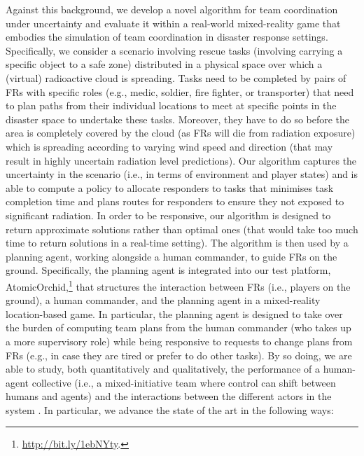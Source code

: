 Against this background, we develop a novel algorithm for team coordination under uncertainty and evaluate it within a real-world mixed-reality game that embodies the simulation of team coordination in disaster response settings. Specifically, we consider a scenario involving rescue tasks (involving carrying a specific object to a safe zone) distributed in a physical space over which a (virtual) radioactive cloud is spreading.  Tasks need to be completed by pairs of FRs with specific roles (e.g., medic, soldier, fire fighter, or transporter) that need to plan paths from their individual locations to meet at specific points in the disaster space to undertake these tasks. Moreover, they have to do so before the area is completely covered by the cloud (as FRs will die from radiation exposure) which is spreading according to varying wind speed and direction (that may result in highly uncertain radiation level predictions). Our algorithm captures the uncertainty in the scenario (i.e., in terms of environment and player states) and  is able to compute a policy to allocate responders to tasks that minimises task completion time and plans routes for responders to ensure they not exposed to significant radiation. In order to be responsive, our algorithm is designed to return approximate solutions rather than optimal ones (that would take too much time to return solutions in a real-time setting).  The algorithm is then used by a planning agent, working alongside a human commander, to guide FRs  on the ground. Specifically, the planning agent is integrated  into our test platform, AtomicOrchid,\footnote{\url{http://bit.ly/1ebNYty}.} that structures the interaction between FRs (i.e., players on the ground), a human commander, and the planning agent in a mixed-reality location-based game. In particular, the planning agent is designed to take over the burden of computing team plans from the human commander (who takes up a more supervisory role) while being responsive to  requests to change plans from FRs (e.g., in case they are tired or prefer to do other tasks). By so doing, we are able to study, both quantitatively and qualitatively, the performance of a human-agent collective (i.e., a mixed-initiative team where control can shift between humans and agents)  and the interactions between the different actors in the system  \cite{jennings:etal:2014}. In particular, we  advance the state of the art in the following ways:
